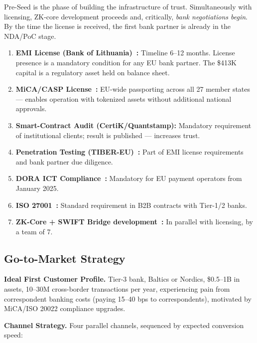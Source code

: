 \documentclass[11pt,a4paper]{article}
\begin{document}
Pre-Seed is the phase of building the infrastructure of trust. Simultaneously with licensing, ZK-core development proceeds and, critically, \textit{bank negotiations begin}. By the time the license is received, the first bank partner is already in the NDA/PoC stage.

\begin{enumerate}[leftmargin=2em, itemsep=5pt, parsep=0pt]
\item \textbf{EMI License (Bank of Lithuania)~\cite{lb_emi}:} Timeline 6--12 months. License presence is a mandatory condition for any EU bank partner. The \$413K capital is a regulatory asset held on balance sheet.
\item \textbf{MiCA/CASP License~\cite{mica_reg,esma_mica}:} EU-wide passporting across all 27 member states --- enables operation with tokenized assets without additional national approvals.
\item \textbf{Smart-Contract Audit (CertiK/Quantstamp):} Mandatory requirement of institutional clients; result is published --- increases trust.
\item \textbf{Penetration Testing (TIBER-EU)~\cite{tiber_eu}:} Part of EMI license requirements and bank partner due diligence.
\item \textbf{DORA ICT Compliance~\cite{dora_reg}:} Mandatory for EU payment operators from January 2025.
\item \textbf{ISO 27001~\cite{iso27001}:} Standard requirement in B2B contracts with Tier-1/2 banks.
\item \textbf{ZK-Core + SWIFT Bridge development~\cite{plonky2,groth16,swift_mt103}:} In parallel with licensing, by a team of 7.
\end{enumerate}

\subsection*{Go-to-Market Strategy}
\label{sec:gtm}

\textbf{Ideal First Customer Profile.} Tier-3 bank, Baltics or Nordics, \$0.5--1B in assets, 10--30M cross-border transactions per year, experiencing pain from correspondent banking costs (paying 15--40 bps to correspondents), motivated by MiCA/ISO 20022 compliance upgrades.

\textbf{Channel Strategy.} Four parallel channels, sequenced by expected conversion speed:
\end{document}
